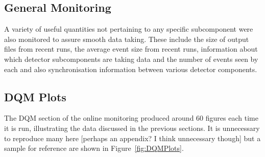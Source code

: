 \subsection{General Monitoring}\label{sec:GeneralMonitoring}

A variety of useful quantities not pertaining to any specific subcomponent were also monitored to assure smooth data taking.  These include the size of output files from recent runs, the average event size from recent runs, information about which detector subcomponents are taking data and the number of events seen by each and also synchronisation information between various detector components.

\subsection{DQM Plots}\label{sec:DQMPlots}

The DQM section of the online monitoring produced around 60 figures each time it is run, illustrating the data discussed in the previous sections.  It is unnecessary to reproduce many here [perhaps an appendix? I think unnecessary though] but a sample for reference are shown in Figure~\ref{fig:DQMPlots}.

